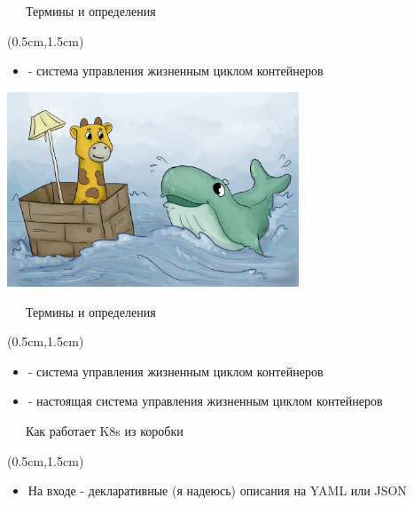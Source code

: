 \documentclass[xetex,18pt,aspectratio=43]{beamer}
\begin{document}
\begin{Large}
\begin{frame}{\ \ \ Термины и определения}
\begin{textblock*}{\framewidth-0.8cm}(0.5cm,1.5cm)
\begin{itemize}
  \item {\color {red}{\bf Docker}} - система управления жизненным циклом контейнеров
\end{itemize}
\begin{minipage}{\textwidth}
  \centering
  \includegraphics[height=5.8cm]{img/pastedImage0}
\end{minipage}
\end{textblock*}
\end{frame}

\begin{frame}{\ \ \ Термины и определения}
\begin{textblock*}{\framewidth-0.8cm}(0.5cm,1.5cm)
\begin{itemize}
  \item {\color {red}{\bf Docker}} - система управления жизненным циклом контейнеров
  \item {\color {red}{\bf Kubernetes}} - настоящая система управления жизненным циклом контейнеров
\end{itemize}
\end{textblock*}
\end{frame}

\begin{frame}{\ \ \ Как работает K8s из коробки}
\begin{textblock*}{\framewidth-0.8cm}(0.5cm,1.5cm)
\begin{itemize}
  \item На входе - декларативные (я надеюсь) описания на YAML или JSON
\end{itemize}
\end{textblock*}
\end{frame}


\end{Large}
\end{document}
